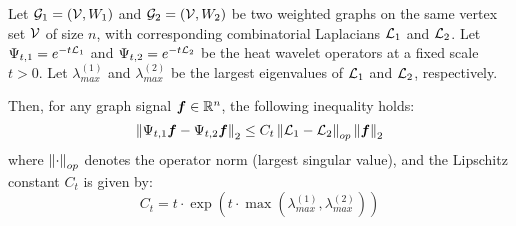 \begin{theorem}
\label{thm:stability_full}
Let $\mathcal{G}_1 = (\mathcal{V}, W_1)$ and $\mathcal{G}_2 = (\mathcal{V}, W_2)$ be two weighted graphs on the same vertex set $\mathcal{V}$ of size $n$, with corresponding combinatorial Laplacians $\mathcal{L}_1$ and $\mathcal{L}_2$. Let $\Psi_{t,1} = e^{-t\mathcal{L}_1}$ and $\Psi_{t,2} = e^{-t\mathcal{L}_2}$ be the heat wavelet operators at a fixed scale $t > 0$. Let $\lambda_{max}^{(1)}$ and $\lambda_{max}^{(2)}$ be the largest eigenvalues of $\mathcal{L}_1$ and $\mathcal{L}_2$, respectively.

Then, for any graph signal $\bm{f} \in \mathbb{R}^n$, the following inequality holds:
\begin{equation}
    \left\lVert\Psi_{t,1}\bm{f} - \Psi_{t,2}\bm{f}\right\rVert_2 \le C_t \left\lVert\mathcal{L}_1 - \mathcal{L}_2\right\rVert_{op} \left\lVert\bm{f}\right\rVert_2
\end{equation}
where $\left\lVert\cdot\right\rVert_{op}$ denotes the operator norm (largest singular value), and the Lipschitz constant $C_t$ is given by:
\begin{equation}
    C_t = t \cdot \exp(t \cdot \max(\lambda_{max}^{(1)}, \lambda_{max}^{(2)}))
\end{equation}
\end{theorem}

